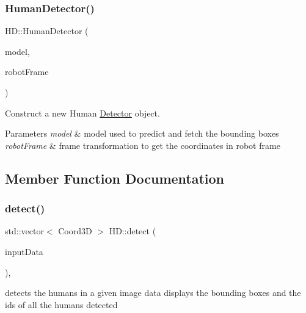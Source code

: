 \subsubsection{\texorpdfstring{Human\+Detector()}{HumanDetector()}}
{\footnotesize\ttfamily H\+D\+::\+Human\+Detector (\begin{DoxyParamCaption}\item[{std\+::unique\+\_\+ptr$<$ \hyperlink{classModel}{Model}$<$ \hyperlink{classData}{Detection\+Output}, Image $>$$>$}]{model,  }\item[{std\+::unique\+\_\+ptr$<$ \hyperlink{classFrameTransformation}{Frame\+Transformation} $>$}]{robot\+Frame }\end{DoxyParamCaption})}



Construct a new Human \hyperlink{classDetector}{Detector} object. 


\begin{DoxyParams}{Parameters}
{\em model} & model used to predict and fetch the bounding boxes \\
\hline
{\em robot\+Frame} & frame transformation to get the coordinates in robot frame \\
\hline
\end{DoxyParams}


\subsection{Member Function Documentation}
\mbox{\label{classHumanDetector_a3883a91447922d9b4bfc8ade8281f947}} 
\subsubsection{\texorpdfstring{detect()}{detect()}}
{\footnotesize\ttfamily std\+::vector$<$ Coord3D $>$ H\+D\+::detect (\begin{DoxyParamCaption}\item[{const cv\+::\+Mat \&}]{input\+Data }\end{DoxyParamCaption})\hspace{0.3cm}{\ttfamily [override]}, {\ttfamily [virtual]}}



detects the humans in a given image data displays the bounding boxes and the ids of all the humans detected 


